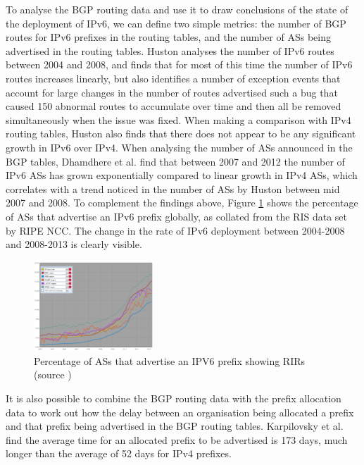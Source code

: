 To analyse the BGP routing data and use it to draw conclusions of the state of
the deployment of IPv6, we can define two simple metrics: the number of BGP
routes for IPv6 prefixes in the routing tables, and the number of ASs being
advertised in the routing tables. Huston analyses the number of IPv6 routes
between 2004 and 2008, and finds that for most of this time the number of IPv6
routes increases linearly, but also identifies a number of exception events that
account for large changes in the number of routes advertised such a bug that
caused 150 abnormal routes to accumulate over time and then all be removed
simultaneously when the issue was fixed\cite{huston_ipv6_2008}. When making a comparison with IPv4
routing tables, Huston also finds that there does not appear to be any
significant growth in IPv6 over IPv4. When analysing the number of ASs announced
in the BGP tables, Dhamdhere et al. find that between 2007 and 2012 the number
of IPv6 ASs has grown exponentially compared to linear growth in IPv4 ASs, which
correlates with a trend noticed in the number of ASs by Huston between mid 2007
and 2008\cite{dhamdhere_measuring_2012}. To complement the findings above, Figure \ref{fig:bgp-rirs} shows the percentage
of ASs that advertise an IPv6 prefix globally, as collated from the RIS data set
by RIPE NCC. The change in the rate of IPv6 deployment between 2004-2008 and
2008-2013 is clearly visible.

\begin{figure}[htb]
\centering
\includegraphics[width=0.4\textwidth]{img/v6-bgp-rirs.png}
\caption{Percentage of ASs that advertise an IPV6 prefix showing RIRs (source
\protect\cite{ripe_ncc_total_2013})}
\label{fig:bgp-rirs}
\end{figure}

It is also possible to combine the BGP routing data with the prefix allocation
data to work out how the delay between an organisation being allocated a prefix
and that prefix being advertised in the BGP routing tables. Karpilovsky et al.
find the average time for an allocated prefix to be advertised is 173 days, much
longer than the average of 52 days for IPv4 prefixes\cite{karpilovsky_quantifying_2009}.

